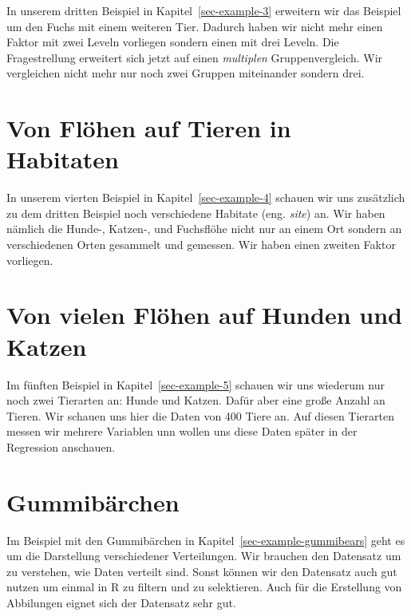 \documentclass[
  letterpaper,
]{scrbook}
\begin{document}
In unserem dritten Beispiel in Kapitel~\ref{sec-example-3} erweitern wir
das Beispiel um den Fuchs mit einem weiteren Tier. Dadurch haben wir
nicht mehr einen Faktor mit zwei Leveln vorliegen sondern einen mit drei
Leveln. Die Fragestrellung erweitert sich jetzt auf einen
\emph{multiplen} Gruppenvergleich. Wir vergleichen nicht mehr nur noch
zwei Gruppen miteinander sondern drei.

\hypertarget{von-fluxf6hen-auf-tieren-in-habitaten}{%
\section*{Von Flöhen auf Tieren in
Habitaten}\label{von-fluxf6hen-auf-tieren-in-habitaten}}

In unserem vierten Beispiel in Kapitel~\ref{sec-example-4} schauen wir
uns zusätzlich zu dem dritten Beispiel noch verschiedene Habitate (eng.
\emph{site}) an. Wir haben nämlich die Hunde-, Katzen-, und Fuchsflöhe
nicht nur an einem Ort sondern an verschiedenen Orten gesammelt und
gemessen. Wir haben einen zweiten Faktor vorliegen.

\hypertarget{von-vielen-fluxf6hen-auf-hunden-und-katzen}{%
\section*{Von vielen Flöhen auf Hunden und
Katzen}\label{von-vielen-fluxf6hen-auf-hunden-und-katzen}}

Im fünften Beispiel in Kapitel~\ref{sec-example-5} schauen wir uns
wiederum nur noch zwei Tierarten an: Hunde und Katzen. Dafür aber eine
große Anzahl an Tieren. Wir schauen uns hier die Daten von 400 Tiere an.
Auf diesen Tierarten messen wir mehrere Variablen unn wollen uns diese
Daten später in der Regression anschauen.

\hypertarget{gummibuxe4rchen}{%
\section*{Gummibärchen}\label{gummibuxe4rchen}}

Im Beispiel mit den Gummibärchen in Kapitel~\ref{sec-example-gummibears}
geht es um die Darstellung verschiedener Verteilungen. Wir brauchen den
Datensatz um zu verstehen, wie Daten verteilt sind. Sonst können wir den
Datensatz auch gut nutzen um einmal in R zu filtern und zu selektieren.
Auch für die Erstellung von Abbilungen eignet sich der Datensatz sehr
gut.
\end{document}

